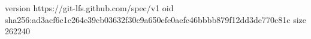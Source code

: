 version https://git-lfs.github.com/spec/v1
oid sha256:ad3acf6c1c264e39cb03632f30c9a650efe0aefc46bbbb879f12dd3de770c81c
size 262240

